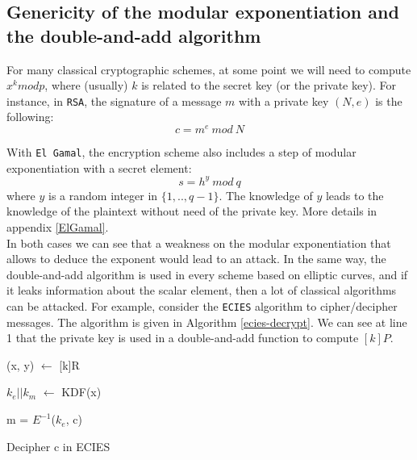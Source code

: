 \documentclass[journal]{IEEEtran}
\begin{document}
\subsection{Genericity of the modular exponentiation and the double-and-add algorithm}
\label{genericity}
For many classical cryptographic schemes, 
at some point we will need to compute $x^k mod p$, where (usually) $k$ is related to the secret key (or the private key). For instance, in {\tt RSA}, 
the signature of a message $m$ with a private key $(N, e)$ is the following: 
$$ c = m^e~mod~N $$

With {\tt El Gamal}, the encryption scheme also includes a step of modular exponentiation with a secret element:
$$ s = h^y~mod~q$$
where $y$ is a random integer in $\{1, .., q-1\}$. The knowledge of $y$ leads to the knowledge of the plaintext without need of the private key. 
More details in appendix \ref{ElGamal}.\\

In both cases we can see that a weakness on the modular exponentiation that allows to deduce the exponent would lead to an attack.
In the same way, the double-and-add algorithm is used in every scheme based on elliptic curves, and if it leaks information about the 
scalar element, then a lot of classical algorithms can be attacked. For example, consider the {\tt ECIES} algorithm to cipher/decipher messages. 
The algorithm is given in Algorithm \ref{ecies-decrypt}. We can see at line 1 that the private key is used in a double-and-add function to compute
$[k]P$. 

\begin{algorithm}

    \SetAlgoLined

    \SetSideCommentLeft 
    \SetNoFillComment

    \LinesNumbered

    
    (x, y) $\leftarrow$ [k]R\;

    $k_e||k_m$ $\leftarrow$ KDF(x)\;
    

    m = $E^{-1}$($k_e$, c)\;


    \caption{Decipher c in ECIES}
    \label{ecies-decrypt}

\end{algorithm}
\end{document}
